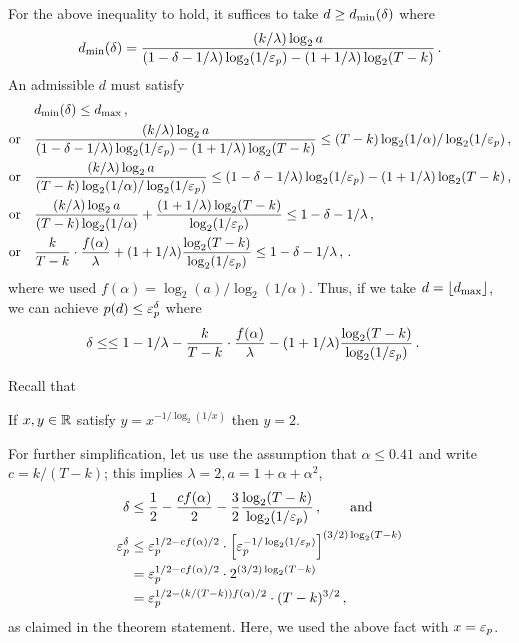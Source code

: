 	For the above inequality to hold, 
	it suffices to take $d \geq d_\mathrm{min}(\delta)$ where 
	$$
		d_\mathrm{min}(\delta) = \frac{(k/\lambda) \log_2 a}{(1 - \delta - 1/\lambda) \log_2(1/\mathsf{\varepsilon}_p) - (1+1/\lambda) \log_2(T - k)}
		\,.
	$$
	An admissible $d$ must satisfy
	\begin{align*}
		&d_\mathrm{min}(\delta) \leq d_\mathrm{max}	\,,\\
		\text{or}\quad &			
			\frac{(k/\lambda) \log_2 a}{(1 - \delta - 1/\lambda) \log_2(1/\mathsf{\varepsilon}_p) - (1+1/\lambda) \log_2(T - k)}
				\leq (T - k) \log_2(1/\alpha)/\log_2(1/\mathsf{\varepsilon}_p) \,,\\
		\text{or}\quad &			
			\frac{(k/\lambda) \log_2 a}{(T - k) \log_2(1/\alpha)/\log_2(1/\mathsf{\varepsilon}_p)} 
				\leq (1 - \delta - 1/\lambda) \log_2(1/\mathsf{\varepsilon}_p) - (1+1/\lambda) \log_2(T - k) \,,\\
    \text{or}\quad &      
      \frac{(k/\lambda) \log_2 a}{(T - k) \log_2(1/\alpha)} + \frac{(1+1/\lambda) \log_2(T - k)}{\log_2(1/\mathsf{\varepsilon}_p)}
        \leq 1 - \delta - 1/\lambda  \,,\\
    \text{or}\quad &      
      \frac{k}{T-k}\cdot \frac{f(\alpha)}{\lambda} + (1+1/\lambda) \frac{ \log_2(T - k)}{\log_2(1/\mathsf{\varepsilon}_p)}
        \leq 1 - \delta - 1/\lambda  \,,
				\,.
	\end{align*}
  where we used $f(\alpha) = \log_2(a)/\log_2(1/\alpha)$. 
	Thus, if we take $d = \lfloor d_\mathrm{max} \rfloor$, we can achieve  $p(d) \leq \mathsf{\varepsilon}_p^{\delta}$ 
	where 
	\begin{align}
		\delta
      &\leq \leq 1 - 1/\lambda - \frac{k}{T-k}\cdot \frac{f(\alpha)}{\lambda} - (1+1/\lambda) \frac{ \log_2(T - k)}{\log_2(1/\mathsf{\varepsilon}_p)}\,. \label{eq:delta}    
	\end{align}


  Recall that 
  \begin{fact*}
    If $x,y \in \mathbb{R}$ satisfy $y = x^{-1/\log_2(1/x)}$ then $y = 2$.
  \end{fact*}
  \noindent
  For further simplification, let us use the assumption that $\alpha \leq 0.41$ 
  and write $c = k/(T-k)$; 
  this implies $\lambda = 2, a = 1 + \alpha + \alpha^2$, 
  \begin{align*}
    \delta
      &\leq \frac{1}{2} - \frac{c f(\alpha)}{2} - \frac{3}{2} \frac{ \log_2(T - k)}{\log_2(1/\mathsf{\varepsilon}_p)}\,, 
      \qquad \text{and}\\
    \mathsf{\varepsilon}_p^\delta  
      &\leq \mathsf{\varepsilon}_p^{1/2 - c f(\alpha)/2} \cdot \left[ \mathsf{\varepsilon}_p^{-1/\log_2(1/\mathsf{\varepsilon}_p)} \right]^{(3/2)\log_2(T - k)} \\
      &= \mathsf{\varepsilon}_p^{1/2 - c f(\alpha)/2} \cdot 2^{(3/2)\log_2(T - k)} \\
      &= \mathsf{\varepsilon}_p^{1/2 - (k/(T-k)) f(\alpha)/2} \cdot (T - k)^{3/2} 
      \,,
  \end{align*}
  as claimed in the theorem statement. 
  Here, we used the above fact with $x = \mathsf{\varepsilon}_p$.

